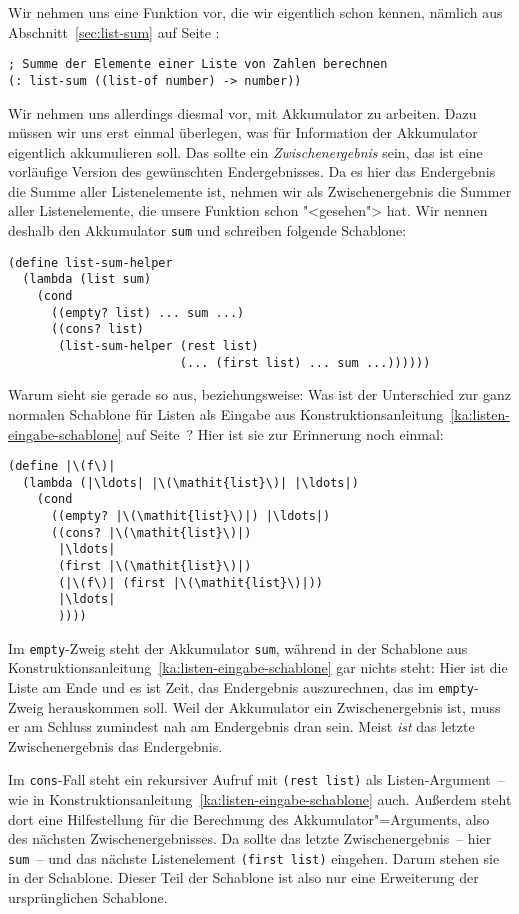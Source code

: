 Wir nehmen uns eine Funktion vor, die wir eigentlich schon kennen,
nämlich aus Abschnitt~\ref{sec:list-sum} auf Seite
\pageref{sec:list-sum}:\label{function:list-sum-acc}
%
\begin{lstlisting}
; Summe der Elemente einer Liste von Zahlen berechnen
(: list-sum ((list-of number) -> number))
\end{lstlisting}
%
Wir nehmen uns allerdings diesmal vor, mit Akkumulator zu arbeiten.
Dazu müssen wir uns erst einmal überlegen, was für Information der
Akkumulator eigentlich akkumulieren soll.  Das sollte ein
\textit{Zwischenergebnis} sein, das ist 
eine vorläufige Version des gewünschten Endergebnisses.  Da es 
hier das Endergebnis die Summe aller Listenelemente ist, nehmen wir
als Zwischenergebnis die Summer aller Listenelemente, die unsere
Funktion schon "<gesehen"> hat.  Wir nennen deshalb den
Akkumulator \lstinline{sum} und schreiben folgende Schablone:
%
\begin{lstlisting}
(define list-sum-helper
  (lambda (list sum)
    (cond
      ((empty? list) ... sum ...)
      ((cons? list)
       (list-sum-helper (rest list)
                        (... (first list) ... sum ...))))))
\end{lstlisting}
%
Warum sieht sie gerade so aus, beziehungsweise: Was ist der Unterschied
zur ganz normalen Schablone für Listen als Eingabe aus
Konstruktionsanleitung~\ref{ka:listen-eingabe-schablone} auf
Seite~\pageref{ka:listen-eingabe-schablone}?   Hier ist sie zur
Erinnerung noch einmal:
%
\begin{lstlisting}
(define |\(f\)|
  (lambda (|\ldots| |\(\mathit{list}\)| |\ldots|)
    (cond
      ((empty? |\(\mathit{list}\)|) |\ldots|)
      ((cons? |\(\mathit{list}\)|)
       |\ldots|
       (first |\(\mathit{list}\)|)
       (|\(f\)| (first |\(\mathit{list}\)|))
       |\ldots|
       ))))
\end{lstlisting}
%
Im \lstinline{empty}-Zweig steht der Akkumulator \lstinline{sum},
während in
der Schablone aus
Konstruktionsanleitung~\ref{ka:listen-eingabe-schablone} gar nichts
steht: Hier ist die Liste am Ende und es ist Zeit, das Endergebnis
auszurechnen, das im \lstinline{empty}-Zweig herauskommen soll.   Weil
der Akkumulator ein Zwischenergebnis ist, muss er am Schluss zumindest
nah am
Endergebnis dran sein.  Meist \emph{ist} das letzte
Zwischenergebnis das Endergebnis.

Im \lstinline{cons}-Fall steht ein rekursiver Aufruf mit
\lstinline{(rest list)} als Listen-Argument~-- wie in
Konstruktionsanleitung~\ref{ka:listen-eingabe-schablone} auch.
Außerdem steht dort eine Hilfestellung für die Berechnung des
Akkumulator"=Arguments, also des nächsten Zwischenergebnisses.  Da
sollte das letzte Zwischenergebnis~-- hier \lstinline{sum}~-- und das
nächste Listenelement \lstinline{(first list)} eingehen. Darum stehen
sie in der Schablone.  Dieser Teil der Schablone ist also nur eine
Erweiterung der ursprünglichen Schablone.

